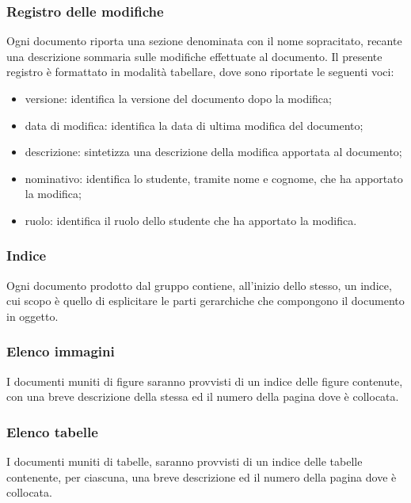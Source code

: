 \subsubsection{Registro delle modifiche}
Ogni documento riporta una sezione denominata con il nome sopracitato, recante una descrizione sommaria sulle modifiche effettuate al documento. Il presente registro è formattato in modalità tabellare, dove sono riportate le seguenti voci:	
\begin{itemize}
	\item versione: identifica la versione del documento dopo la modifica;
	\item data di modifica: identifica la data di ultima modifica del documento;
	\item descrizione: sintetizza una descrizione della modifica apportata al documento;
	\item nominativo: identifica lo studente, tramite nome e cognome, che ha apportato la modifica;
	\item ruolo: identifica il ruolo dello studente che ha apportato la modifica.
\end{itemize}

\subsubsection{Indice}
Ogni documento prodotto dal gruppo {\Gruppo} contiene, all’inizio dello stesso, un indice, cui scopo è quello di esplicitare le parti gerarchiche che compongono il documento in oggetto. 

\subsubsection{Elenco immagini}
I documenti muniti di figure saranno provvisti di un indice delle figure contenute, con una breve descrizione della stessa ed il numero della pagina dove è collocata.

\subsubsection{Elenco tabelle}
I documenti muniti di tabelle, saranno provvisti di un indice delle tabelle contenente, per
ciascuna, una breve descrizione ed il numero della pagina dove è collocata.


